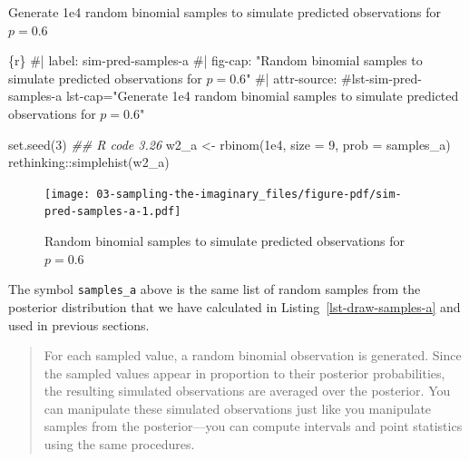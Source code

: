 \documentclass[
  letterpaper,
  DIV=11,
  numbers=noendperiod]{scrreprt}
\newenvironment{Shaded}{\begin{snugshade}}{\end{snugshade}}
\newcommand{\AttributeTok}[1]{\textcolor[rgb]{0.40,0.45,0.13}{#1}}
\newcommand{\CommentTok}[1]{\textcolor[rgb]{0.37,0.37,0.37}{#1}}
\newcommand{\DecValTok}[1]{\textcolor[rgb]{0.68,0.00,0.00}{#1}}
\newcommand{\DocumentationTok}[1]{\textcolor[rgb]{0.37,0.37,0.37}{\textit{#1}}}
\newcommand{\FloatTok}[1]{\textcolor[rgb]{0.68,0.00,0.00}{#1}}
\newcommand{\FunctionTok}[1]{\textcolor[rgb]{0.28,0.35,0.67}{#1}}
\newcommand{\InformationTok}[1]{\textcolor[rgb]{0.37,0.37,0.37}{#1}}
\newcommand{\NormalTok}[1]{\textcolor[rgb]{0.00,0.23,0.31}{#1}}
\newcommand{\OtherTok}[1]{\textcolor[rgb]{0.00,0.23,0.31}{#1}}
\newcommand{\SpecialCharTok}[1]{\textcolor[rgb]{0.37,0.37,0.37}{#1}}
\begin{document}
\begin{codelisting}

\caption{Generate 1e4 random binomial samples to simulate predicted
observations for \(p = 0.6\)}

\hypertarget{lst-sim-pred-samples-a}{%
\label{lst-sim-pred-samples-a}}%
\begin{Shaded}
\begin{Highlighting}[]
\InformationTok{\textasciigrave{}\textasciigrave{}\textasciigrave{}\{r\}}
\CommentTok{\#| label: sim{-}pred{-}samples{-}a}
\CommentTok{\#| fig{-}cap: "Random binomial samples to simulate predicted observations for $p = 0.6$"}
\CommentTok{\#| attr{-}source: \textquotesingle{}\#lst{-}sim{-}pred{-}samples{-}a lst{-}cap="Generate 1e4 random binomial samples to simulate predicted observations for $p = 0.6$"\textquotesingle{}}

\FunctionTok{set.seed}\NormalTok{(}\DecValTok{3}\NormalTok{)}
\DocumentationTok{\#\# R code 3.26}
\NormalTok{w2\_a }\OtherTok{\textless{}{-}} \FunctionTok{rbinom}\NormalTok{(}\FloatTok{1e4}\NormalTok{, }\AttributeTok{size =} \DecValTok{9}\NormalTok{, }\AttributeTok{prob =}\NormalTok{ samples\_a)}
\NormalTok{rethinking}\SpecialCharTok{::}\FunctionTok{simplehist}\NormalTok{(w2\_a)}
\InformationTok{\textasciigrave{}\textasciigrave{}\textasciigrave{}}
\end{Highlighting}
\end{Shaded}

\end{codelisting}

\begin{figure}[H]

{\centering \texttt{[image: 03-sampling-the-imaginary\_files/figure-pdf/sim-pred-samples-a-1.pdf]}

}

\caption{Random binomial samples to simulate predicted observations for
\(p = 0.6\)}

\end{figure}

The symbol \texttt{samples\_a} above is the same list of random samples
from the posterior distribution that we have calculated in
Listing~\ref{lst-draw-samples-a} and used in previous sections.

\begin{quote}
For each sampled value, a random binomial observation is generated.
Since the sampled values appear in proportion to their posterior
probabilities, the resulting simulated observations are averaged over
the posterior. You can manipulate these simulated observations just like
you manipulate samples from the posterior---you can compute intervals
and point statistics using the same procedures.
\end{quote}
\end{document}
